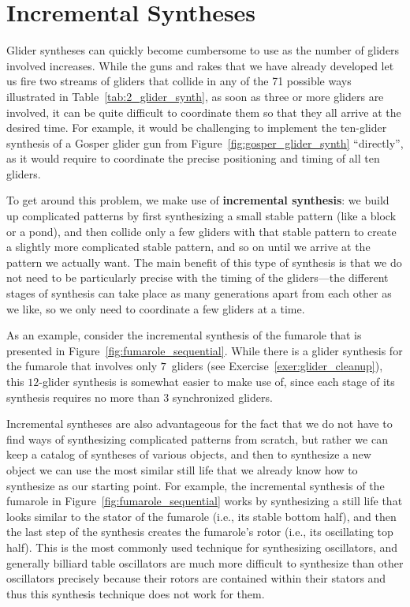 \section{Incremental Syntheses}\label{sec:incremental_synthesis}

Glider syntheses can quickly become cumbersome to use as the number of gliders involved increases. While the guns and rakes that we have already developed let us fire two streams of gliders that collide in any of the 71 possible ways illustrated in Table~\ref{tab:2_glider_synth}, as soon as three or more gliders are involved, it can be quite difficult to coordinate them so that they all arrive at the desired time. For example, it would be challenging to implement the ten-glider synthesis of a Gosper glider gun from Figure~\ref{fig:gosper_glider_synth} ``directly'', as it would require to coordinate the precise positioning and timing of all ten gliders.

To get around this problem, we make use of \textbf{incremental synthesis}: we build up complicated patterns by first synthesizing a small stable pattern (like a block or a pond), and then collide only a few gliders with that stable pattern to create a slightly more complicated stable pattern, and so on until we arrive at the pattern we actually want. The main benefit of this type of synthesis is that we do not need to be particularly precise with the timing of the gliders---the different stages of synthesis can take place as many generations apart from each other as we like, so we only need to coordinate a few gliders at a time.

As an example, consider the incremental synthesis of the fumarole that is presented in Figure~\ref{fig:fumarole_sequential}. While there is a glider synthesis for the fumarole that involves only $7$~gliders (see Exercise~\ref{exer:glider_cleanup}), this $12$-glider synthesis is somewhat easier to make use of, since each stage of its synthesis requires no more than $3$ synchronized gliders.

Incremental syntheses are also advantageous for the fact that we do not have to find ways of synthesizing complicated patterns from scratch, but rather we can keep a catalog of syntheses of various objects, and then to synthesize a new object we can use the most similar still life that we already know how to synthesize as our starting point. For example, the incremental synthesis of the fumarole in Figure~\ref{fig:fumarole_sequential} works by synthesizing a still life that looks similar to the stator of the fumarole (i.e., its stable bottom half), and then the last step of the synthesis creates the fumarole's rotor (i.e., its oscillating top half). This is the most commonly used technique for synthesizing oscillators, and generally billiard table oscillators are much more difficult to synthesize than other oscillators precisely because their rotors are contained within their stators and thus this synthesis technique does not work for them.

